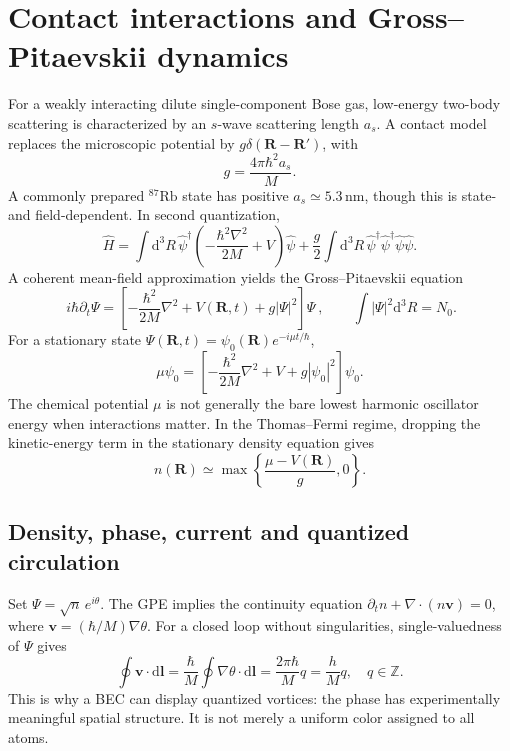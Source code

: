 \documentclass[11pt,a4paper]{article}
\newcommand{\Rb}{^{87}\mathrm{Rb}}
\newcommand{\dd}{\mathrm d}
\begin{document}
\section{Contact interactions and Gross--Pitaevskii dynamics}
For a weakly interacting dilute single-component Bose gas, low-energy two-body scattering is characterized by an $s$-wave scattering length $a_s$. A contact model replaces the microscopic potential by $g\delta(\mathbf R-\mathbf R')$, with
\begin{equation}
g=\frac{4\pi\hbar^2a_s}{M}.
\end{equation}
A commonly prepared $\Rb$ state has positive $a_s\simeq5.3\,$nm, though this is state- and field-dependent. In second quantization,
\begin{equation}
\hat H=\int\dd^3R\,\hat\psi^\dagger\left(-\frac{\hbar^2\nabla^2}{2M}+V\right)\hat\psi+
\frac g2\int\dd^3R\,\hat\psi^\dagger\hat\psi^\dagger\hat\psi\hat\psi.
\end{equation}
A coherent mean-field approximation yields the Gross--Pitaevskii equation
\begin{equation}
\boxed{\ i\hbar\partial_t\Psi=\left[-\frac{\hbar^2}{2M}\nabla^2+V(\mathbf R,t)+g|\Psi|^2\right]\Psi\ },\qquad \int|\Psi|^2\dd^3R=N_0.
\label{eq:gpe}
\end{equation}
For a stationary state $\Psi(\mathbf R,t)=\psi_0(\mathbf R)e^{-i\mu t/\hbar}$,
\begin{equation}
\mu\psi_0=\left[-\frac{\hbar^2}{2M}\nabla^2+V+g|\psi_0|^2\right]\psi_0.
\end{equation}
The chemical potential $\mu$ is not generally the bare lowest harmonic oscillator energy when interactions matter. In the Thomas--Fermi regime, dropping the kinetic-energy term in the stationary density equation gives
\begin{equation}
n(\mathbf R)\simeq\max\left\{\frac{\mu-V(\mathbf R)}{g},0\right\}.
\end{equation}

\subsection{Density, phase, current and quantized circulation}
Set $\Psi=\sqrt n\,e^{i\theta}$. The GPE implies the continuity equation $\partial_t n+\nabla\cdot(n\mathbf v)=0$, where $\mathbf v=(\hbar/M)\nabla\theta$. For a closed loop without singularities, single-valuedness of $\Psi$ gives
\begin{equation}
\oint\mathbf v\cdot\dd\mathbf l=\frac{\hbar}{M}\oint\nabla\theta\cdot\dd\mathbf l=\frac{2\pi\hbar}{M}q=\frac hM q,\quad q\in\mathbb Z.
\end{equation}
This is why a BEC can display quantized vortices: the phase has experimentally meaningful spatial structure. It is not merely a uniform color assigned to all atoms.
\end{document}
